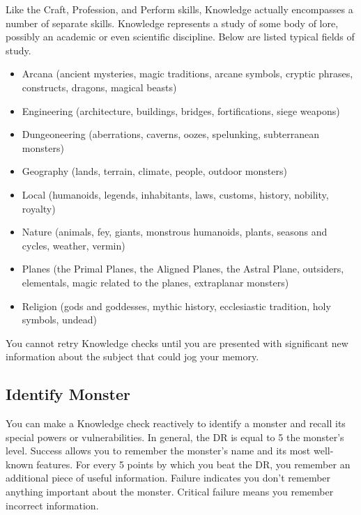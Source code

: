 \newpage
{}
        Like the Craft, Profession, and Perform skills, Knowledge actually encompasses a number of separate skills. Knowledge represents a study of some body of lore, possibly an academic or even scientific discipline. Below are listed typical fields of study.
        \begin{itemize}
            \item Arcana (ancient mysteries, magic traditions, arcane symbols,
                cryptic phrases, constructs, dragons, magical beasts)
            \item Engineering (architecture, buildings, bridges, fortifications, siege weapons)
            \item Dungeoneering (aberrations, caverns, oozes, spelunking, subterranean monsters)
            \item Geography (lands, terrain, climate, people, outdoor monsters)
            \item Local (humanoids, legends, inhabitants, laws, customs, history, nobility, royalty)
            \item Nature (animals, fey, giants, monstrous humanoids, plants, seasons and cycles, weather, vermin)
            \item Planes (the Primal Planes, the Aligned Planes, the Astral Plane,
                outsiders, elementals, magic related to the planes, extraplanar monsters)
            \item Religion (gods and goddesses, mythic history, ecclesiastic tradition, holy symbols, undead)
        \end{itemize}

        You cannot retry Knowledge checks until you are presented with significant new information about the subject that could jog your memory.

    \subsection{Identify Monster}
        You can make a Knowledge check reactively to identify a monster and recall its special powers or vulnerabilities. In general, the DR is equal to 5 \add the monster's level. Success allows you to remember the monster's name and its most well-known features. For every 5 points by which you beat the DR, you remember an additional piece of useful information. Failure indicates you don't remember anything important about the monster. Critical failure means you remember incorrect information.

